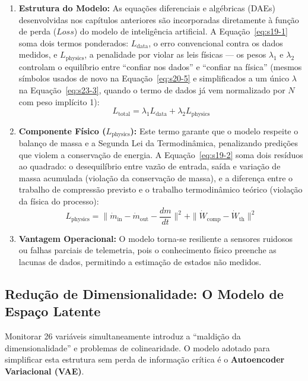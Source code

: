 \documentclass[12pt,a4paper]{article}
\numberwithin{equation}{section}
\numberwithin{table}{section}
\numberwithin{figure}{section}
\begin{document}
\begin{enumerate}
	\item \textbf{Estrutura do Modelo:}
	As equações diferenciais e algébricas (DAEs) desenvolvidas nos capítulos anteriores são incorporadas diretamente à função de perda ($Loss$) do modelo de inteligência artificial. A Equação~\eqref{eq:s19-1} soma dois termos ponderados: $L_{\text{data}}$, o erro convencional contra os dados medidos, e $L_{\text{physics}}$, a penalidade por violar as leis físicas — os pesos $\lambda_1$ e $\lambda_2$ controlam o equilíbrio entre ``confiar nos dados'' e ``confiar na física'' (mesmos símbolos usados de novo na Equação~\eqref{eq:s20-5} e simplificados a um único $\lambda$ na Equação~\eqref{eq:s23-3}, quando o termo de dados já vem normalizado por $N$ com peso implícito 1):
	\begin{equation}\label{eq:s19-1}
 L_{\text{total}} = \lambda_1 L_{\text{data}} + \lambda_2 L_{\text{physics}}
\end{equation}

	\item \textbf{Componente Físico ($L_{\text{physics}}$):}
	Este termo garante que o modelo respeite o balanço de massa e a Segunda Lei da Termodinâmica, penalizando predições que violem a conservação de energia. A Equação~\eqref{eq:s19-2} soma dois resíduos ao quadrado: o desequilíbrio entre vazão de entrada, saída e variação de massa acumulada (violação da conservação de massa), e a diferença entre o trabalho de compressão previsto e o trabalho termodinâmico teórico (violação da física do processo):
	\begin{equation}\label{eq:s19-2}
 L_{\text{physics}} = \| \dot{m}_{\text{in}} - \dot{m}_{\text{out}} - \frac{dm}{dt} \|^2 + \| \dot{W}_{\text{comp}} - \dot{W}_{\text{th}} \|^2
\end{equation}
	
	\item \textbf{Vantagem Operacional:}
	O modelo torna-se resiliente a sensores ruidosos ou falhas parciais de telemetria, pois o conhecimento físico preenche as lacunas de dados, permitindo a estimação de estados não medidos.
\end{enumerate}

\subsection{Redução de Dimensionalidade: O Modelo de Espaço Latente}

Monitorar 26 variáveis simultaneamente introduz a ``maldição da dimensionalidade'' e problemas de colinearidade. O modelo adotado para simplificar esta estrutura sem perda de informação crítica é o \textbf{Autoencoder Variacional (VAE)}.
\end{document}
